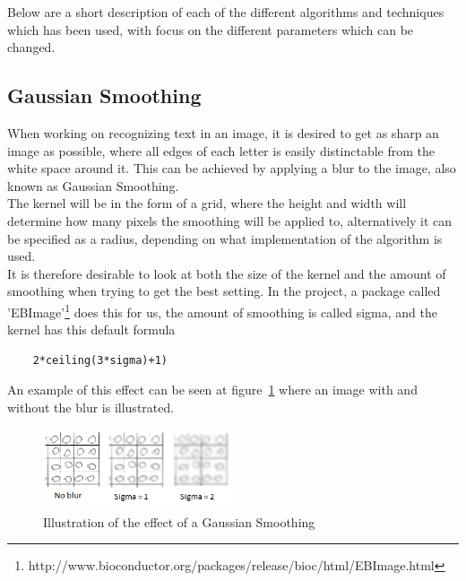\documentclass[report]{subfiles}
\begin{document}
Below are a short description of each of the different algorithms and techniques which has been used, with focus on the different parameters which can be changed.

\subsection{Gaussian Smoothing}
\label{sec:gaussianSmoothing}
When working on recognizing text in an image, it is desired to get as sharp an image as possible, where all edges of each letter is easily distinctable from the white space around it. This can be achieved by applying a blur to the image, also known as Gaussian Smoothing.\\ 
The kernel will be in the form of a grid, where the height and width will determine how many pixels the smoothing will be applied to, alternatively it can be specified as a radius, depending on what implementation of the algorithm is used.\\
It is therefore desirable to look at both the size of the kernel and the amount of smoothing when trying to get the best setting. In the project, a package called 'EBImage'\footnote{http://www.bioconductor.org/packages/release/bioc/html/EBImage.html} does this for us, the amount of smoothing is called sigma, and the kernel has this default formula 
\begin{lstlisting}
	2*ceiling(3*sigma)+1)
\end{lstlisting}
An example of this effect can be seen at figure~\ref{fig:imgExplainBlur} where an image with and without the blur is illustrated.

\begin{figure}[H]
	\centering
	\includegraphics[width=0.5\textwidth]{images/imgBlurDesc}
	\caption{Illustration of the effect of a Gaussian Smoothing}
	\label{fig:imgExplainBlur}
\end{figure}
\end{document}
